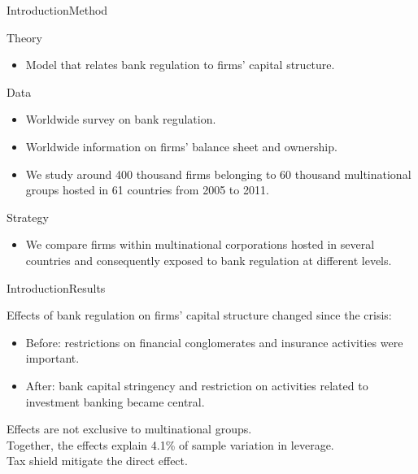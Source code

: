 \documentclass{beamer}
\begin{document}
\begin{frame}{Introduction}{Method}

Theory
\begin{itemize}
	\item Model that relates bank regulation to firms' capital structure.	
\end{itemize}
\vspace{\baselineskip}
Data
\begin{itemize}
	\item Worldwide survey on bank regulation.
	\item Worldwide information on firms' balance sheet and ownership.
	\item We study around 400 thousand firms belonging to 60 thousand multinational groups hosted in 61 countries from 2005 to 2011.	
\end{itemize}
	\vspace{\baselineskip}
	Strategy
\begin{itemize}
	\item We compare firms within multinational corporations hosted in several countries
	and consequently exposed to bank regulation at different levels. 
	
	
\end{itemize}




 
\end{frame}

\begin{frame}{Introduction}{Results}

 Effects of bank regulation on firms' capital structure changed since the crisis: \\
\begin{itemize}
	
	\item Before: restrictions on financial conglomerates and insurance activities were important.
	\item After: bank capital stringency and restriction on activities related to investment banking became central.
\end{itemize}
\vspace{\baselineskip}
Effects are not exclusive to multinational groups.\\
\vspace{\baselineskip}
Together, the effects explain 4.1\% of sample variation in leverage.  \\
\vspace{\baselineskip}
Tax shield mitigate the direct effect.

\end{frame}
\end{document}
